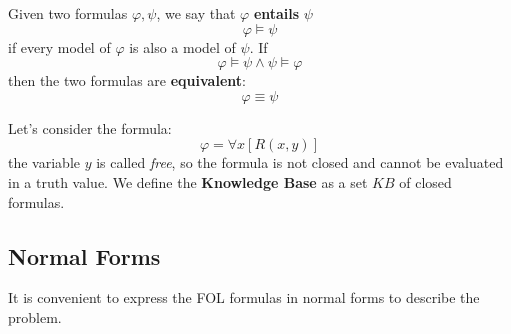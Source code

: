 \documentclass[10pt, letterpaper]{report}
\begin{document}
\begin{definition}
    Given two formulas $\varphi,\psi$, we say that $\varphi$ \textbf{entails} $\psi$ $$ \varphi\models\psi$$ if every model of $\varphi$ is also a model of $\psi$. If $$\varphi\models\psi\land \psi\models\varphi $$
    then the two formulas are \textbf{equivalent}:$$ \varphi\equiv\psi$$
\end{definition}
Let's consider the formula:\begin{equation}
    \varphi=\forall x [R(x,y)]
\end{equation}
the variable $y$ is called \textit{free}, so the formula is not closed and cannot be evaluated in a truth value. We define the \textbf{Knowledge Base} as a set $KB$ of closed formulas.
\subsection{Normal Forms}
It is convenient to express the FOL formulas in normal forms to describe the problem. \bigskip
\end{document}
